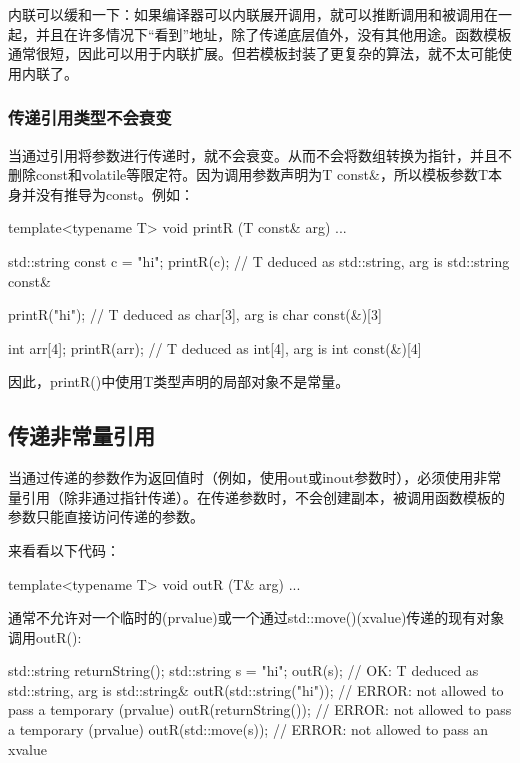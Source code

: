 内联可以缓和一下：如果编译器可以内联展开调用，就可以推断调用和被调用在一起，并且在许多情况下“看到”地址，除了传递底层值外，没有其他用途。函数模板通常很短，因此可以用于内联扩展。但若模板封装了更复杂的算法，就不太可能使用内联了。

\subsubsection{传递引用类型不会衰变}

当通过引用将参数进行传递时，就不会衰变。从而不会将数组转换为指针，并且不删除const和volatile等限定符。因为调用参数声明为T const\&，所以模板参数T本身并没有推导为const。例如：

\begin{cpp}
template<typename T>
void printR (T const& arg) {
	...
}

std::string const c = "hi";
printR(c); // T deduced as std::string, arg is std::string const&

printR("hi"); // T deduced as char[3], arg is char const(&)[3]

int arr[4];
printR(arr); // T deduced as int[4], arg is int const(&)[4]
\end{cpp}

因此，printR()中使用T类型声明的局部对象不是常量。

\subsection{传递非常量引用}

当通过传递的参数作为返回值时（例如，使用out或inout参数时），必须使用非常量引用（除非通过指针传递）。在传递参数时，不会创建副本，被调用函数模板的参数只能直接访问传递的参数。

来看看以下代码：

\begin{cpp}
template<typename T>
void outR (T& arg) {
	...
}
\end{cpp}

通常不允许对一个临时的(prvalue)或一个通过std::move()(xvalue)传递的现有对象调用outR():

\begin{cpp}
std::string returnString();
std::string s = "hi";
outR(s); // OK: T deduced as std::string, arg is std::string&
outR(std::string("hi")); // ERROR: not allowed to pass a temporary (prvalue)
outR(returnString()); // ERROR: not allowed to pass a temporary (prvalue)
outR(std::move(s)); // ERROR: not allowed to pass an xvalue
\end{cpp}

